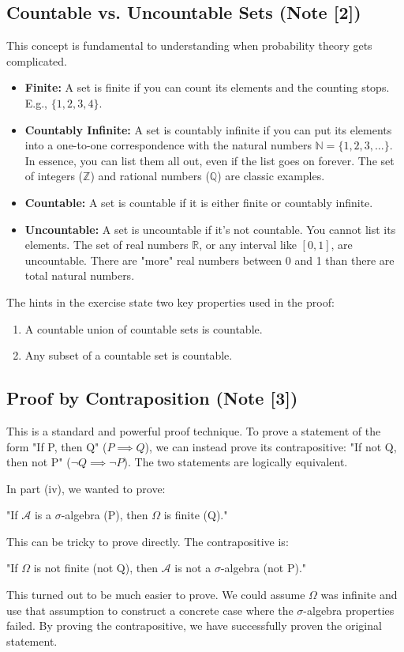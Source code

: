 \documentclass[11pt,a4paper]{article}
\begin{document}
\subsection{Countable vs. Uncountable Sets (\hypertarget{note2}{Note [2]}) }
This concept is fundamental to understanding when probability theory gets complicated.
\begin{itemize}
    \item \textbf{Finite:} A set is finite if you can count its elements and the counting stops. E.g., $\{1,2,3,4\}$.
    \item \textbf{Countably Infinite:} A set is countably infinite if you can put its elements into a one-to-one correspondence with the natural numbers $\mathbb{N} = \{1, 2, 3, \ldots\}$. In essence, you can list them all out, even if the list goes on forever. The set of integers ($\mathbb{Z}$) and rational numbers ($\mathbb{Q}$) are classic examples.
    \item \textbf{Countable:} A set is countable if it is either finite or countably infinite.
    \item \textbf{Uncountable:} A set is uncountable if it's not countable. You cannot list its elements. The set of real numbers $\mathbb{R}$, or any interval like $[0,1]$, are uncountable. There are "more" real numbers between 0 and 1 than there are total natural numbers.
\end{itemize}
The hints in the exercise state two key properties used in the proof:
\begin{enumerate}
    \item A countable union of countable sets is countable.
    \item Any subset of a countable set is countable.
\end{enumerate}

\subsection{Proof by Contraposition (\hypertarget{note3}{Note [3]}) }
This is a standard and powerful proof technique. To prove a statement of the form "If P, then Q" ($P \implies Q$), we can instead prove its contrapositive: "If not Q, then not P" ($\neg Q \implies \neg P$). The two statements are logically equivalent.

In part (iv), we wanted to prove:
\begin{center}
    "If $\mathcal{A}$ is a $\sigma$-algebra (P), then $\Omega$ is finite (Q)."
\end{center}
This can be tricky to prove directly. The contrapositive is:
\begin{center}
    "If $\Omega$ is not finite (not Q), then $\mathcal{A}$ is not a $\sigma$-algebra (not P)."
\end{center}
This turned out to be much easier to prove. We could assume $\Omega$ was infinite and use that assumption to construct a concrete case where the $\sigma$-algebra properties failed. By proving the contrapositive, we have successfully proven the original statement.
\end{document}
